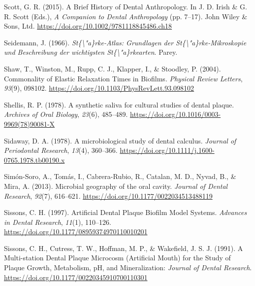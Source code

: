 \documentclass[
  letterpaper,
]{book}
\newlength{\cslhangindent}
\newlength{\cslentryspacingunit} %
\newenvironment{CSLReferences}[2] %
 {%
  \setlength{\parindent}{0pt}
  \ifodd #1
  \let\oldpar\par
  \def\par{\hangindent=\cslhangindent\oldpar}
  \fi
  \setlength{\parskip}{#2\cslentryspacingunit}
 }%
 {}
\begin{document}
\begin{CSLReferences}{1}{0}
\leavevmode{}%
Scott, G. R. (2015). A {Brief History} of {Dental Anthropology}. In J.
D. Irish \& G. R. Scott (Eds.), \emph{A {Companion} to {Dental
Anthropology}} (pp. 7--17). {John Wiley \& Sons, Ltd}.
\url{https://doi.org/10.1002/9781118845486.ch18}

\leavevmode{}%
Seidemann, J. (1966). \emph{St\{\textbackslash"a\}rke-{Atlas}:
{Grundlagen} der {St}\{\textbackslash"a\}rke-{Mikroskopie} und
{Beschreibung} der wichtigsten {St}\{\textbackslash"a\}rkearten}.
{Parey}.

\leavevmode{}%
Shaw, T., Winston, M., Rupp, C. J., Klapper, I., \& Stoodley, P. (2004).
Commonality of {Elastic Relaxation Times} in {Biofilms}. \emph{Physical
Review Letters}, \emph{93}(9), 098102.
\url{https://doi.org/10.1103/PhysRevLett.93.098102}

\leavevmode{}%
Shellis, R. P. (1978). A synthetic saliva for cultural studies of dental
plaque. \emph{Archives of Oral Biology}, \emph{23}(6), 485--489.
\url{https://doi.org/10.1016/0003-9969(78)90081-X}

\leavevmode{}%
Sidaway, D. A. (1978). A microbiological study of dental calculus.
\emph{Journal of Periodontal Research}, \emph{13}(4), 360--366.
\url{https://doi.org/10.1111/j.1600-0765.1978.tb00190.x}

\leavevmode{}%
Simón-Soro, A., Tomás, I., Cabrera-Rubio, R., Catalan, M. D., Nyvad, B.,
\& Mira, A. (2013). Microbial geography of the oral cavity.
\emph{Journal of Dental Research}, \emph{92}(7), 616--621.
\url{https://doi.org/10.1177/0022034513488119}

\leavevmode{}%
Sissons, C. H. (1997). Artificial {Dental Plaque Biofilm Model Systems}.
\emph{Advances in Dental Research}, \emph{11}(1), 110--126.
\url{https://doi.org/10.1177/08959374970110010201}

\leavevmode{}%
Sissons, C. H., Cutress, T. W., Hoffman, M. P., \& Wakefield, J. S. J.
(1991). A {Multi-station Dental Plaque Microcosm} ({Artificial Mouth})
for the {Study} of {Plaque Growth}, {Metabolism}, {pH}, and
{Mineralization}: \emph{Journal of Dental Research}.
\url{https://doi.org/10.1177/00220345910700110301}


\end{CSLReferences}
\end{document}
